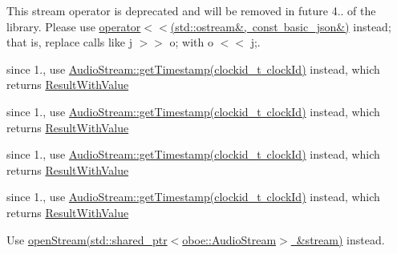 \begin{DoxyRefList}
\label{deprecated__deprecated000416}%
%
This stream operator is deprecated and will be removed in future 4.. of the library. Please use \mbox{\hyperlink{classnlohmann_1_1basic__json_a5e34c5435e557d0bf666bd7311211405}{operator$<$$<$(std\+::ostream\&, const basic\+\_\+json\&)}} instead; that is, replace calls like {\ttfamily j $>$$>$ o;} with {\ttfamily o $<$$<$ j;}.  
\item[Member \mbox{\hyperlink{classoboe_1_1_audio_stream_acb8edbc17ff79993a8ed996d216fe6f3}{oboe::Audio\+Stream::get\+Timestamp}} (clockid\+\_\+t, int64\+\_\+t $\ast$, int64\+\_\+t $\ast$)]\label{deprecated__deprecated000242}%
%
since 1., use \mbox{\hyperlink{classoboe_1_1_audio_stream_a672e813af2c2b6953d0414bbe5c09d65}{Audio\+Stream\+::get\+Timestamp(clockid\+\_\+t clock\+Id)}} instead, which returns \mbox{\hyperlink{classoboe_1_1_result_with_value}{Result\+With\+Value}} 

\label{deprecated__deprecated000244}%
%
since 1., use \mbox{\hyperlink{classoboe_1_1_audio_stream_a672e813af2c2b6953d0414bbe5c09d65}{Audio\+Stream\+::get\+Timestamp(clockid\+\_\+t clock\+Id)}} instead, which returns \mbox{\hyperlink{classoboe_1_1_result_with_value}{Result\+With\+Value}} 

\label{deprecated__deprecated000252}%
%
since 1., use \mbox{\hyperlink{classoboe_1_1_audio_stream_a672e813af2c2b6953d0414bbe5c09d65}{Audio\+Stream\+::get\+Timestamp(clockid\+\_\+t clock\+Id)}} instead, which returns \mbox{\hyperlink{classoboe_1_1_result_with_value}{Result\+With\+Value}} 

\label{deprecated__deprecated000254}%
%
since 1., use \mbox{\hyperlink{classoboe_1_1_audio_stream_a672e813af2c2b6953d0414bbe5c09d65}{Audio\+Stream\+::get\+Timestamp(clockid\+\_\+t clock\+Id)}} instead, which returns \mbox{\hyperlink{classoboe_1_1_result_with_value}{Result\+With\+Value}}  
\item[Member \mbox{\hyperlink{classoboe_1_1_audio_stream_builder_a86b94cfa47729bef2e04dce1a9086074}{oboe::Audio\+Stream\+Builder::open\+Stream}} (\mbox{\hyperlink{classoboe_1_1_audio_stream}{Audio\+Stream}} $\ast$$\ast$stream)]\label{deprecated__deprecated000243}%
%
Use \mbox{\hyperlink{classoboe_1_1_audio_stream_builder_a44b68216c48f8fb08a9e63178e0b0eeb}{open\+Stream(std\+::shared\+\_\+ptr$<$oboe\+::\+Audio\+Stream$>$ \&stream)}} instead. 


\end{DoxyRefList}
